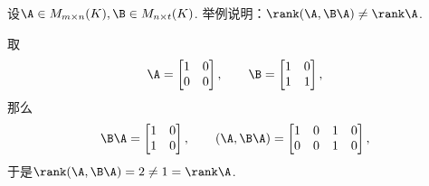 \begin{example}
设\(\A \in M_{m \times n}(K),
\B \in M_{n \times t}(K)\).
举例说明：\(\rank(\A,\B \A) \neq \rank\A\).
\begin{solution}
取\[
	\A = \begin{bmatrix}
		1 & 0 \\
		0 & 0
	\end{bmatrix},
	\qquad
	\B = \begin{bmatrix}
		1 & 0 \\
		1 & 1
	\end{bmatrix},
\]
那么\[
	\B \A = \begin{bmatrix}
		1 & 0 \\
		1 & 0
	\end{bmatrix},
	\qquad
	(\A,\B \A) = \begin{bmatrix}
		1 & 0 & 1 & 0 \\
		0 & 0 & 1 & 0
	\end{bmatrix},
\]
于是\(\rank(\A,\B \A) = 2 \neq 1 = \rank\A\).
\end{solution}
\end{example}

